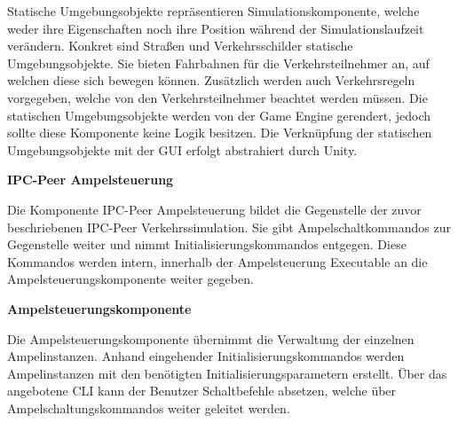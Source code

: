 Statische Umgebungsobjekte repräsentieren Simulationskomponente, welche weder ihre Eigenschaften noch ihre Position während der Simulationslaufzeit verändern. Konkret sind Straßen und Verkehrsschilder statische Umgebungsobjekte. Sie bieten Fahrbahnen für die Verkehrsteilnehmer an, auf welchen diese sich bewegen können. Zusätzlich werden auch Verkehrsregeln vorgegeben, welche von den Verkehrsteilnehmer beachtet werden müssen. Die statischen Umgebungsobjekte werden von der Game Engine gerendert, jedoch sollte diese Komponente keine Logik besitzen. Die Verknüpfung der statischen Umgebungsobjekte mit der GUI erfolgt abstrahiert durch Unity.

\begin{flushleft}
\textbf{IPC-Peer Ampelsteuerung}
\end{flushleft}
\vspace{-0.3 cm}

Die Komponente IPC-Peer Ampelsteuerung bildet die Gegenstelle der zuvor beschriebenen IPC-Peer Verkehrssimulation. Sie gibt Ampelschaltkommandos zur Gegenstelle weiter und nimmt Initialisierungskommandos entgegen. Diese Kommandos werden intern, innerhalb der Ampelsteuerung Executable an die Ampelsteuerungskomponente weiter gegeben.

\begin{flushleft}
\textbf{Ampelsteuerungskomponente}
\end{flushleft}
\vspace{-0.3 cm}

Die Ampelsteuerungskomponente übernimmt die Verwaltung der einzelnen Ampelinstanzen. Anhand eingehender Initialisierungskommandos werden Ampelinstanzen mit den benötigten Initialisierungsparametern erstellt. Über das angebotene CLI kann der Benutzer Schaltbefehle absetzen, welche über Ampelschaltungskommandos weiter geleitet werden.